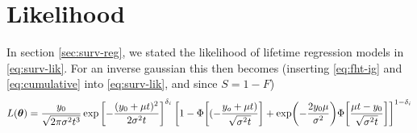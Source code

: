 \section{Likelihood}\label{sec:lik}
In section \ref{sec:surv-reg}, we stated the likelihood of lifetime regression models in \eqref{eq:surv-lik}. For an inverse gaussian this then becomes (inserting \eqref{eq:fht-ig} and \eqref{eq:cumulative} into \eqref{eq:surv-lik}, and since $S=1-F$)
\begin{equation}\label{eq:fht-lik}
L(\btheta)=\frac{y_0}{\sqrt{2\pi\sigma^2t^3}}\exp\left[-\frac{(y_0+\mu t)^2}{2\sigma^2t}\right]^{\delta_i}\sqb*{1-\Phi\sqb*{(-\frac{y_o+\mu t)}{\sqrt{\sigma^2t}}}+\exp\p*{-\frac{2y_0\mu}{\sigma^2}}\Phi\sqb*{\frac{\mu t-y_0}{\sqrt{\sigma^2t}}}}^{1-\delta_i}
\end{equation}